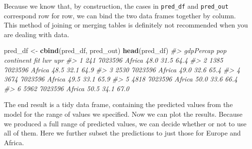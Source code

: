 \documentclass[]{book}
\newenvironment{Shaded}{\begin{snugshade}}{\end{snugshade}}
\newcommand{\CommentTok}[1]{\textcolor[rgb]{0.56,0.35,0.01}{\textit{#1}}}
\newcommand{\KeywordTok}[1]{\textcolor[rgb]{0.13,0.29,0.53}{\textbf{#1}}}
\newcommand{\NormalTok}[1]{#1}
\newcommand{\StringTok}[1]{\textcolor[rgb]{0.31,0.60,0.02}{#1}}
\begin{document}
Because we know that, by construction, the cases in \texttt{pred\_df} and \texttt{pred\_out} correspond row for row, we can bind the two data frames together by column. This method of joining or merging tables is definitely not recommended when you are dealing with data.\\

\begin{Shaded}
\begin{Highlighting}[]
\NormalTok{pred_df <-}\StringTok{ }\KeywordTok{cbind}\NormalTok{(pred_df, pred_out)}
\KeywordTok{head}\NormalTok{(pred_df)}
\CommentTok{#>   gdpPercap     pop continent  fit  lwr  upr}
\CommentTok{#> 1       241 7023596    Africa 48.0 31.5 64.4}
\CommentTok{#> 2      1385 7023596    Africa 48.5 32.1 64.9}
\CommentTok{#> 3      2530 7023596    Africa 49.0 32.6 65.4}
\CommentTok{#> 4      3674 7023596    Africa 49.5 33.1 65.9}
\CommentTok{#> 5      4818 7023596    Africa 50.0 33.6 66.4}
\CommentTok{#> 6      5962 7023596    Africa 50.5 34.1 67.0}
\end{Highlighting}
\end{Shaded}

The end result is a tidy data frame, containing the predicted values from the model for the range of values we specified. Now we can plot the results. Because we produced a full range of predicted values, we can decide whether or not to use all of them. Here we further subset the predictions to just those for Europe and Africa.\\
\end{document}
